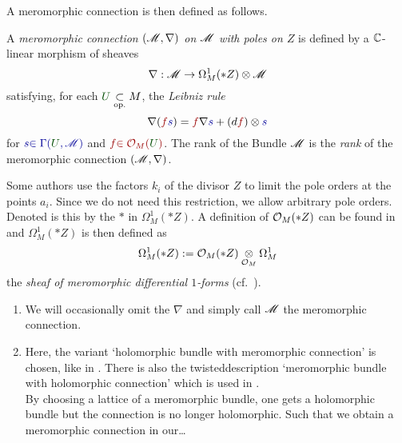 A meromorphic connection is then defined as follows.
\begin{defn}\label{defn:mercon}
  \def\myU{\textcolor{green!30!black}{U}}
  \def\mys{\textcolor{blue!60!black}{s}}
  \def\myf{\textcolor{red!60!black}{f}}
  A \emph{meromorphic connection $(\mathscr{M},\nabla)$ on $\mathscr{M}$ with poles on $Z$}
  is defined by a $\mathbb{C}$-linear morphism of sheaves
  \[
    \nabla:\mathscr{M}\to\Omega_M^1(*Z)\otimes\mathscr{M}
  \]
  satisfying, for each $\myU\underset{\text{op.}}{\subset} M$, the
  \emph{Leibniz rule}
    \[
      \nabla(\myf\mys)=\myf\nabla\mys+(d\myf)\otimes\mys
    \]
  for $\mys\textcolor{blue!60!black}{\in\Gamma(\myU,\sM)}$ and
  $\myf\textcolor{red!60!black}{\in\cO_M(\myU)}$.
  The rank of the Bundle $\mathscr{M}$ is the \emph{rank} of the meromorphic connection
  $(\mathscr{M},\nabla)$.
  \begin{s-rem}
    Some authors use the factors $k_i$ of the divisor $Z$ to limit the pole
    orders at the points $a_i$. Since we do not need this restriction, we allow
    arbitrary pole orders. Denoted is this by the $*$ in $\Omega_M^1(*Z)$.
    A definition of $\mathcal{O}_M(*Z)$ can be found
    in~\cite[Sec.0.8]{sabbah2007isomonodromic} and $\Omega_M^1(*Z)$ is then
    defined as
    \[
      \Omega_M^1(*Z):=\mathcal{O}_M(*Z)\underset{\mathcal{O}_M}\otimes\Omega_M^1
    \]
    the \emph{sheaf of meromorphic differential $1$-forms} (cf.\
    \cite[Sec.0.9.b]{sabbah2007isomonodromic}).
  \end{s-rem}
\end{defn}
\begin{rem}
  \begin{enumerate}
    \item We will occasionally omit the $\nabla$ and simply call $\mathscr{M}$ the
      meromorphic connection.
    \item Here, the variant `holomorphic bundle with meromorphic connection' is
      chosen, like in \cite{boalch}.
      There is also the twisted description `meromorphic
      bundle with holomorphic connection' which is used in
      \cite{sabbah2007isomonodromic}.
      \\ By choosing a lattice of a meromorphic bundle, one gets a holomorphic
      bundle but the connection is no longer holomorphic. Such that we obtain a
      meromorphic connection in our\dots\TODO
  \end{enumerate}
\end{rem}

